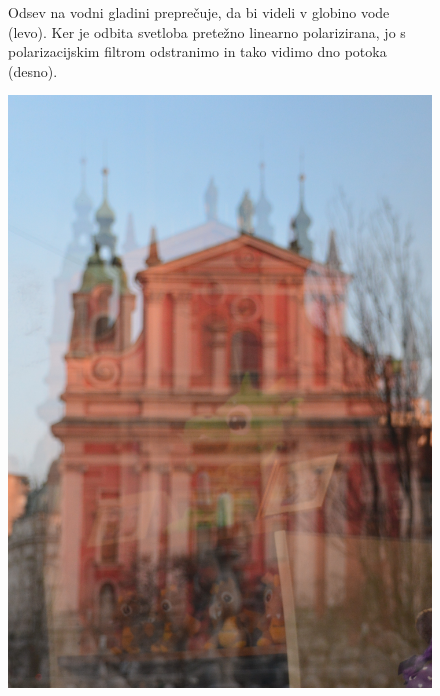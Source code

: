 \begin{remark}
\begin{figure}[htp]
\caption{Odsev na vodni gladini preprečuje, da bi videli v globino vode (levo).
Ker je odbita svetloba pretežno linearno polarizirana, jo s polarizacijskim 
filtrom odstranimo in tako vidimo dno potoka (desno).}
\label{fig:04_odsevvoda}
\end{figure}

\begin{figure}[htp]
\centering
\includegraphics[width=6truecm]{slike/04_photos_zmaj2.jpg}\qquad \qquad

\end{figure}
\end{remark}
